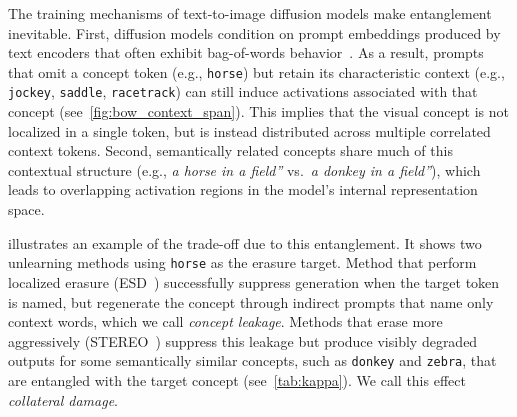 
The training mechanisms of text-to-image diffusion models make entanglement inevitable.
First, diffusion models condition on prompt embeddings produced by text encoders that often exhibit bag-of-words behavior~\citep{yuksekgonul2022and}. As a result, prompts that omit a concept token (e.g., \texttt{horse}) but retain its characteristic context (e.g., \texttt{jockey}, \texttt{saddle}, \texttt{racetrack})
can still induce activations associated with that concept (see~\cref{fig:bow_context_span}). This implies that the visual concept is not localized in a single token, but is instead distributed across multiple correlated context tokens. Second, semantically related concepts share much of this contextual structure (e.g., \emph{a horse in a field''} vs.\ \emph{a donkey in a field''}), which leads to overlapping activation regions in the model’s internal representation space.

 illustrates an example of the trade-off due to this entanglement. It shows two unlearning methods using \texttt{horse} as the erasure target.
Method that perform localized erasure (ESD~\cite{gandikota2023erasing}) successfully suppress generation when the target token is named, but regenerate the concept through indirect prompts that name only context words, which we call \emph{concept leakage}. 
Methods that erase more aggressively (STEREO~\cite{srivatsan2025stereo}) suppress this leakage but produce visibly degraded outputs for some semantically similar concepts, such as \texttt{donkey} and \texttt{zebra}, that are entangled with the target concept (see~\cref{tab:kappa}). We call this effect \emph{collateral damage}. 

